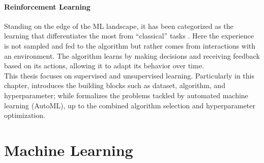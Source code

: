 \documentclass[a4paper,12pt,times,numbered,print,index]{Classes/PhDThesisPSnPDF}
\begin{document}
\paragraph{Reinforcement Learning} Standing on the edge of the ML landscape, it has been categorized as the learning that differentiates the most from ``classical'' tasks \cite{sutton2018reinforcement}.
Here the experience is not sampled and fed to the algorithm but rather comes from interactions with an environment.
The algorithm learns by making decisions and receiving feedback based on its actions, allowing it to adapt its behavior over time.\\

This thesis focuses on supervised and unsupervised learning.
Particularly in this chapter,  introduces the building blocks such as dataset, algorithm, and hyperparameter; while
 formalizes the problems tackled by automated machine learning (AutoML), up to the combined algorithm selection and hyperparameter optimization.

\section{Machine Learning}\label{automl-background-sec:ml}


\end{document}
